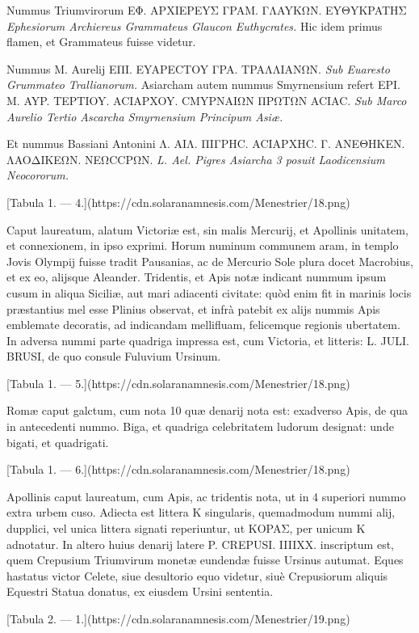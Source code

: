 \documentclass[a4paper, 11pt, oneside, polutonikogreek, latin]{article}
\begin{document}
Nummus Triumvirorum EΦ. APXIEPEYΣ ΓPAM. ΓΛAYKΩN. EYΘYKPATHΣ \emph{Ephesiorum Archiereus Grammateus Glaucon Euthycrates.} Hic idem primus flamen, et Grammateus fuisse videtur.

Nummus M. Aurelij EΠI. EYAPECTOY ΓPA. TPAΛΛIANΩN. \emph{Sub Euaresto Grummateo Trallianorum.} Asiarcham autem nummus Smyrnensium refert EPI. M. AYP. TEPTIOY. ACIAPXOY. CMYPNAIΩN ΠPΩTΩN ACIAC. \emph{Sub Marco Aurelio Tertio Ascarcha Smyrnensium Principum Asiæ.}

Et nummus Bassiani Antonini Λ. AIΛ. ΠIΓPHC. ACIAPXHC. Γ. ANEΘHKEN. ΛAOΔIKEΩN. NEΩCCPΩN. \emph{L. Ael. Pigres Asiarcha 3 posuit Laodicensium Neocororum.}

[Tabula 1. --- 4.](https://cdn.solaranamnesis.com/Menestrier/18.png)

Caput laureatum, alatum Victoriæ est, sin malis Mercurij, et Apollinis unitatem, et connexionem, in ipso exprimi. Horum numinum communem aram, in templo Jovis Olympij fuisse tradit Pausanias, ac de Mercurio Sole plura docet Macrobius, et ex eo, alijsque Aleander. Tridentis, et Apis notæ indicant nummum ipsum cusum in aliqua Siciliæ, aut mari adiacenti civitate: quòd enim fit in marinis locis præstantius mel esse Plinius observat, et infrà patebit ex alijs nummis Apis emblemate decoratis, ad indicandam mellifluam, felicemque regionis ubertatem. In adversa nummi parte quadriga impressa est, cum Victoria, et litteris: L. JULI. BRUSI, de quo consule Fuluvium Ursinum.

[Tabula 1. --- 5.](https://cdn.solaranamnesis.com/Menestrier/18.png)

Romæ caput galctum, cum nota 10 quæ denarij nota est: exadverso Apis, de qua in antecedenti nummo. Biga, et quadriga celebritatem ludorum designat: unde bigati, et quadrigati.

[Tabula 1. --- 6.](https://cdn.solaranamnesis.com/Menestrier/18.png)

Apollinis caput laureatum, cum Apis, ac tridentis nota, ut in 4 superiori nummo extra urbem cuso. Adiecta est littera K singularis, quemadmodum nummi alij, dupplici, vel unica littera signati reperiuntur, ut KOPAΣ, per unicum K adnotatur. In altero huius denarij latere P. CREPUSI. IIIIXX. inscriptum est, quem Crepusium Triumvirum monetæ eundendæ fuisse Ursinus autumat. Eques hastatus victor Celete, siue desultorio equo videtur, siuè Crepusiorum aliquis Equestri Statua donatus, ex eiusdem Ursini sententia.

[Tabula 2. --- 1.](https://cdn.solaranamnesis.com/Menestrier/19.png)
\end{document}
